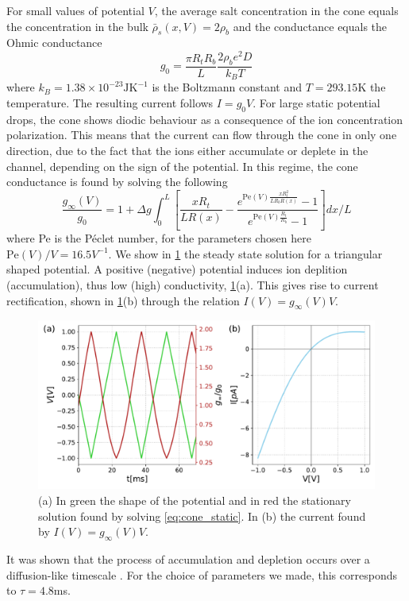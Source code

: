 \documentclass[10.5pt]{article}
\begin{document}
For small values of potential $V$, the average salt concentration in the cone equals the concentration in the bulk $\bar{\rho}_s(x,V)=2\rho_b$ and the conductance equals the Ohmic conductance
\[
g_{0}=\frac{\pi R_{t}R_{b}}{L}\frac{2\rho_b e^2 D}{k_B T}
\]
where $k_B=1.38\times 10^{-23}\text{JK}^{-1}$ is the Boltzmann constant and $T=293.15$K the temperature. The resulting current follows $I = g_0 V$.
For large static potential drops, the cone shows diodic behaviour as a consequence of the ion concentration polarization. This means that the current can flow through the cone in only one direction, due to the fact that the ions either accumulate or deplete in the channel, depending on the sign of the potential. In this regime, the cone conductance is found by solving the following
\begin{equation}
\frac{g_{\infty}(V)}{g_0} = 1 + \Delta g \int_{0}^{L}\left[ \frac{x R_t}{L R(x)} - \frac{e^{\text{Pe}(V)\frac{x R_t^2}{L R_b R(x)}}-1}{ e^{\text{Pe}(V)\frac{R_t}{R_b}} - 1 } \right] dx/L
\label{eq:cone_static}
\end{equation}
where Pe is the Péclet number, for the parameters chosen here $\text{Pe}(V)/V = 16.5 V^{-1}$. We show in \cref{fig:cone_steady_state} the steady state solution for a triangular shaped potential. A positive (negative) potential induces ion deplition (accumulation), thus low (high) conductivity, \cref{fig:cone_steady_state}(a). This gives rise to current rectification, shown in \cref{fig:cone_steady_state}(b) through the relation $I(V) = g_{\infty}(V) V$.
\begin{figure}[h]
    \centering
    \includegraphics[width=0.7\columnwidth]{../figures_tex/cone_steady_state.pdf}
    \caption{(a) In green the shape of the potential and in red the stationary solution found by solving \cref{eq:cone_static}. In (b) the current found by $I(V) = g_{\infty}(V)V$.}
    \label{fig:cone_steady_state}
\end{figure}

It was shown that the process of accumulation and depletion occurs over a diffusion-like timescale \cite{tau_ref}. For the choice of parameters we made, this corresponds to $\tau = 4.8$ms.
\end{document}
